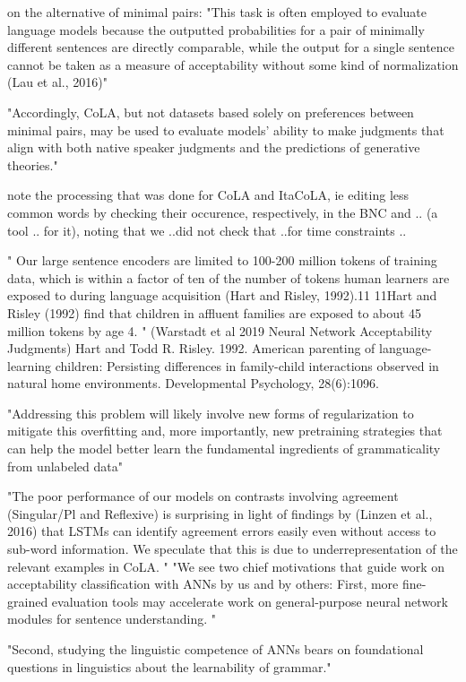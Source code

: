 on the alternative of minimal pairs:
"This task is often employed
to evaluate language models because the outputted
probabilities for a pair of minimally different sentences are directly comparable, while the output
for a single sentence cannot be taken as a measure
of acceptability without some kind of normalization (Lau et al., 2016)"

"Accordingly, CoLA, but not datasets based
solely on preferences between minimal pairs, may
be used to evaluate models’ ability to make judgments that align with both native speaker judgments and the predictions of generative theories."

note the processing that was done for CoLA and ItaCoLA, ie editing less common words by checking their occurence, respectively, in the BNC and .. (a tool .. for it), noting that we ..did not check that ..for time constraints ..

" Our large sentence encoders are limited
to 100-200 million tokens of training data, which
is within a factor of ten of the number of tokens
human learners are exposed to during language
acquisition (Hart and Risley, 1992).11 
11Hart and Risley (1992) find that children in affluent families are exposed to about 45 million tokens by age 4.
" (Warstadt et al 2019 Neural Network Acceptability Judgments)
Hart and Todd R. Risley. 1992. American
parenting of language-learning children: Persisting differences in family-child interactions
observed in natural home environments. Developmental Psychology, 28(6):1096.


"Addressing this problem will likely involve new forms of regularization to mitigate this
overfitting and, more importantly, new pretraining
strategies that can help the model better learn the fundamental ingredients of grammaticality from
unlabeled data" 

"The poor performance of our models on contrasts involving agreement (Singular/Pl and Reflexive) is surprising in light of findings by (Linzen
et al., 2016) that LSTMs can identify agreement
errors easily even without access to sub-word information. We speculate that this is due to underrepresentation of the relevant examples in CoLA.
"
"We see two chief motivations that guide work
on acceptability classification with ANNs by us
and by others: First, more fine-grained evaluation tools may accelerate work on general-purpose
neural network modules for sentence understanding. "

"Second, studying the linguistic competence
of ANNs bears on foundational questions in linguistics about the learnability of grammar."

